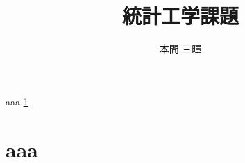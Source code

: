 \documentclass[titlepage,a4paper]{jsarticle}
\title{統計工学課題}
\author{本間 三暉}
\begin{document}
\maketitle
aaa
\ref{aa}
\section{aaa}\label{aa}
\end{document}

